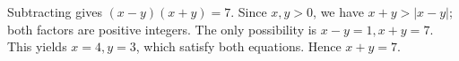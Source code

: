 Subtracting gives $(x-y)(x+y)=7 $. Since $ x,y>0 $, we have $ x+y>|x-y|$; both factors are positive integers. The only possibility is $ x-y=1,x+y=7 $. This yields $ x=4,y=3 $, which satisfy both equations. Hence $\boxed{x+y=7}$.

